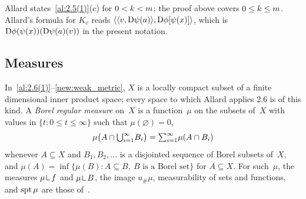 \begin{remark}
    \label{rem:2.5}
    Allard states~\ref{al:2.5(1)}(c) for $0 < k < m$; the proof above covers $0 \le k
    \le m$. Allard's formula for $K_v$ reads $\langle \langle v, \mathrm{D} \psi(a) \rangle, \mathrm{D}
    \phi[\psi(x)] \rangle$, which is $\mathrm{D} \phi(\psi(x))(\mathrm{D} \psi(a)(v))$ in the present
    notation.
\end{remark}

\subsection{Measures}

\begin{definition}
    \label{al:2.6(1)}
    In~\ref{al:2.6(1)}--\ref{new:weak_metric}, $X$ is a locally compact subset of a finite
    dimensional inner product space; every space to which Allard applies 2.6 is of this kind.
    A \emph{Borel regular measure} on~$X$ is a function~$\mu$ on the subsets of~$X$ with values
    in $\{ t : 0 \le t \le \infty \}$ such that $\mu(\varnothing) = 0$,
    \begin{displaymath}
        \mu \big( A \cap {{\textstyle \bigcup}}_{i=1}^\infty B_i \big) = {\textstyle\sum_{i=1}^{\infty}} \mu(A \cap B_i)
    \end{displaymath}
    whenever $A \subseteq X$ and $B_1, B_2, \ldots$ is a disjointed sequence of Borel subsets
    of~$X$, and $\mu(A) = \inf \{ \mu(B) : A \subseteq B,\ B \text{ is a Borel set} \}$ for $A
    \subseteq X$. For such~$\mu$, the measures $\mu \restrict f$ and $\mu \restrict B$, the image
    $u_\# \mu$, measurability of sets and functions, and $\operatorname{spt} \mu$ are those of~\cite[2.4.10,
    2.1.2, 2.3.2, 2.2.1]{Federer1969}.
\end{definition}

